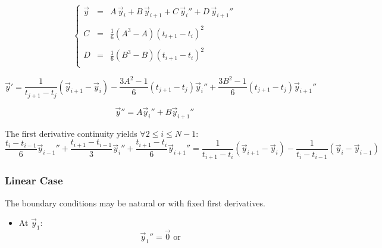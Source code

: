 \documentclass[aps,12pt]{revtex4}
\begin{document}
\begin{equation}
\left\lbrace
\begin{array}{rcl}
	\vec{y}   & = & A \, \vec{y}_i + B \, \vec{y}_{i+1} + C \, \vec{y}_i'' + D \, \vec{y}_{i+1}''\\
	\\
	C & = & \frac{1}{6} \left(A^3 - A\right) (t_{i+1}-t_i)^2\\
	\\
	D & = & \frac{1}{6} \left(B^3 - B\right) (t_{i+1}-t_i)^2\\
\end{array}
\right.
\end{equation}

\begin{equation}
	\vec{y}' = \dfrac{1}{t_{j+1}-t_j} \left(\vec{y}_{i+1}-\vec{y}_i\right) 
	- \dfrac{3A^2-1}{6} (t_{j+1}-t_j) \vec{y}_i''
	+ \dfrac{3B^2-1}{6} (t_{j+1}-t_j) \vec{y}_{i+1}''
\end{equation}	


\begin{equation}
	\vec{y}'' = A \vec{y}_i'' + B \vec{y}_{i+1}''
\end{equation}

The first derivative continuity yields $\forall 2\leq i \leq N-1$:
\begin{equation}
 	\dfrac{t_{i}-t_{i-1}}{6} \vec{y}_{i-1}'' + 
	\dfrac{t_{i+1}-t_{i-1}}{3} \vec{y}_i''
	+\dfrac{t_{i+1}-t_{i}}{6} \vec{y}_{i+1}''  = 
	\dfrac{1}{t_{i+1}-t_i} \left( \vec{y}_{i+1} - \vec{y}_{i} \right) -
	\dfrac{1}{t_{i}-t_{i-1}} \left( \vec{y}_i - \vec{y}_{i-1} \right) 
\end{equation}


\subsubsection{Linear Case}
The boundary conditions may be natural or with fixed first derivatives.
\begin{itemize}
\item At $\vec{y}_1$:
\begin{equation}
	\vec{y}_1'' = \vec{0} \text{ or } 
\end{equation}
\end{itemize}
\end{document}
